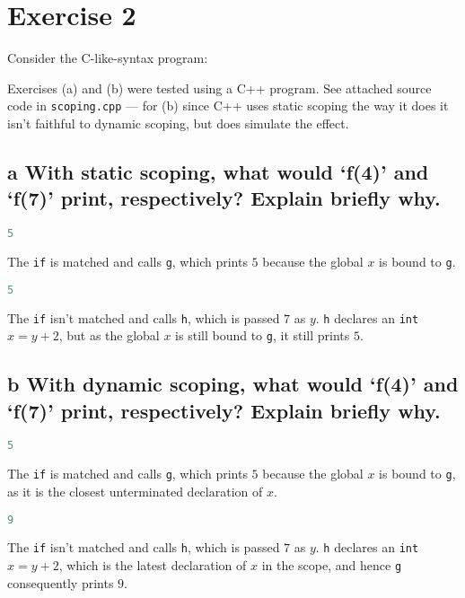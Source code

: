 \documentclass[11pt,a4paper]{article}
\begin{document}
\newpage
\section{Exercise 2}
Consider the C-like-syntax program:

Exercises (a) and (b) were tested using a C++ program. See attached source
code in {\tt scoping.cpp} --- for (b) since C++ uses static scoping the way it
does it isn't faithful to dynamic scoping, but does simulate the effect.

\subsection*{a \mdseries With static  scoping, what would `f(4)' and `f(7)'
print, respectively? Explain briefly why.}
\begin{multicols}{2}

\begin{lstlisting}[language=C,numbers=none]
	5
\end{lstlisting}
The {\tt if} is matched and calls {\tt g}, which prints $5$ because the global
$x$ is bound to {\tt g}.

\vfill\columnbreak

\begin{lstlisting}[language=C,numbers=none]
	5
\end{lstlisting}
The {\tt if} isn't matched and calls {\tt h}, which is passed $7$ as $y$.
{\tt h} declares an {\tt int} $x = y + 2$, but as the global $x$ is still
bound to {\tt g}, it still prints $5$.

\vfill\columnbreak

\end{multicols}

\subsection*{b \mdseries With dynamic scoping, what would `f(4)' and `f(7)'
print, respectively? Explain briefly why.}
\begin{multicols}{2}

\begin{lstlisting}[language=C,numbers=none]
	5
\end{lstlisting}
The {\tt if} is matched and calls {\tt g}, which prints $5$ because the global
$x$ is bound to {\tt g}, as it is the closest unterminated declaration of $x$.

\vfill\columnbreak

\begin{lstlisting}[language=C,numbers=none]
	9
\end{lstlisting}
The {\tt if} isn't matched and calls {\tt h}, which is passed $7$ as $y$.
{\tt h} declares an {\tt int} $x = y + 2$, which is the latest declaration of
$x$ in the scope, and hence {\tt g} consequently prints $9$.

\vfill\columnbreak

\end{multicols}
\end{document}
